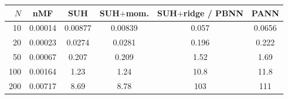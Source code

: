 \begin{tabular}{rccccc}
\hline\hline
$N$ & nMF & SUH & SUH$+$mom. & SUH$+$ridge / PBNN & PANN\\
\hline
10 & 0.00014 & 0.00877 & 0.00839 & 0.057 & 0.0656\\
20 & 0.00023 & 0.0274 & 0.0281 & 0.196 & 0.222\\
50 & 0.00067 & 0.207 & 0.209 & 1.52 & 1.69\\
100 & 0.00164 & 1.23 & 1.24 & 10.8 & 11.8\\
200 & 0.00717 & 8.69 & 8.78 & 103 & 111\\
\hline\hline
\end{tabular}
